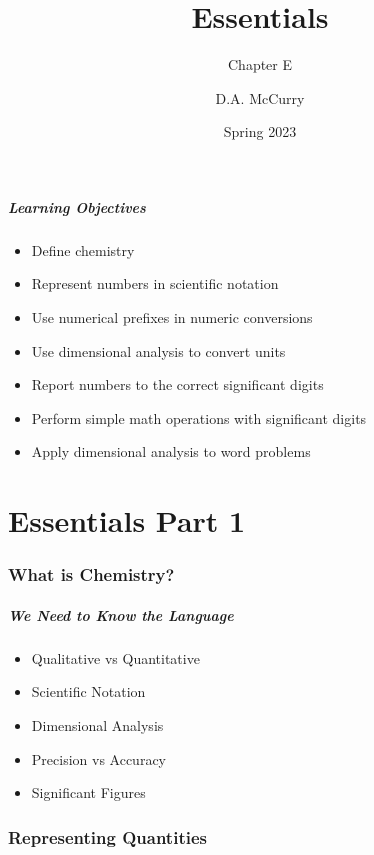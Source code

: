 \documentclass[notes=only]{beamer}
\title{Essentials}%
\subtitle{Chapter E}
\institute[CHEM115 Bloomsburg University]{CHEM115 --- Chemistry for the Sciences I \\ Bloomsburg University}
\author{D.A. McCurry}
\date{Spring 2023}
\begin{document}
\maketitle

\begin{frame}
	\frametitle{Learning Objectives}

	\begin{itemize}
		\item Define chemistry
		\item Represent numbers in scientific notation
		\item Use numerical prefixes in numeric conversions
		\item Use dimensional analysis to convert units
		\item Report numbers to the correct significant digits
		\item Perform simple math operations with significant digits
		\item Apply dimensional analysis to word problems
	\end{itemize}
\end{frame}

\part{Essentials Part 1}

\section{What is Chemistry?}

\begin{frame}
	\frametitle{We Need to Know the Language}
	\begin{itemize}
		\item Qualitative vs Quantitative
		\item Scientific Notation
		\item Dimensional Analysis
		\item Precision vs Accuracy
		\item Significant Figures
	\end{itemize}
\end{frame}

\section{Representing Quantities}
\end{document}
